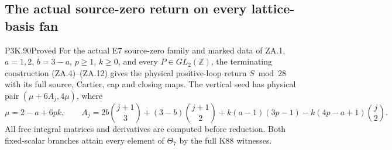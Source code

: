 \subsection{The actual source-zero return on every lattice-basis fan}
\begin{statement}{P3K.90}{Proved}
For the actual E7 source-zero family and marked data of ZA.1,
\(a=1,2\), \(b=3-a\), \(p\ge1\), \(k\ge0\), and every
\(P\in GL_2(\mathbb Z)\), the terminating construction
(ZA.4)--(ZA.12) gives the physical positive-loop return
\(S\bmod28\) with its full source, Cartier, cap and closing maps.
The vertical seed has physical pair
\((\mu+6A_j,4\mu)\), where
\[
\mu=2-a+6pk,\qquad
A_j=2b\binom{j+1}{3}+(3-b)\binom{j+1}{2}
+k(a-1)(3p-1)-k(4p-a+1)\binom j2.
\]
All free integral matrices and derivatives are computed before
reduction. Both fixed-scalar branches attain every element of
\(\Theta_7\) by the full K88 witnesses.
\end{statement}
